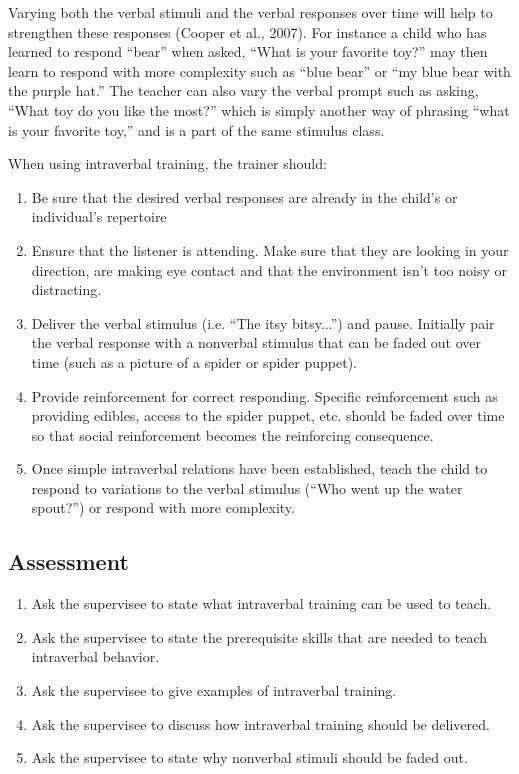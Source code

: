 Varying both the verbal stimuli and the verbal responses over time will help to strengthen these responses (Cooper et al., 2007).   For instance a child who has learned to respond ``bear'' when asked, ``What is your favorite toy?'' may then learn to respond with more complexity such as ``blue bear'' or ``my blue bear with the purple hat.''  The teacher can also vary the verbal prompt such as asking, ``What toy do you like the most?'' which is simply another way of phrasing ``what is your favorite toy,'' and is a part of the same stimulus class.    

When using intraverbal training, the trainer should:
\begin{enumerate}
\item Be sure that the desired verbal responses are already in the child's or individual's repertoire
\item Ensure that the listener is attending.  Make sure that they are looking in your direction, are making eye contact and that the environment isn't too noisy or distracting.
\item Deliver the verbal stimulus (i.e. ``The itsy bitsy...'') and pause.  Initially pair the verbal response with a nonverbal stimulus that can be faded out over time (such as a picture of a spider or spider puppet).
\item Provide reinforcement for correct responding. Specific reinforcement such as providing edibles, access to the spider puppet, etc. should be faded over time so that social reinforcement becomes the reinforcing consequence.  
\item Once simple intraverbal relations have been established, teach the child to respond to variations to the verbal stimulus (``Who went up the water spout?'') or respond with more complexity.    
\end{enumerate}
%
\subsection{Assessment}
\begin{enumerate}
\item Ask the supervisee to state what intraverbal training can be used to teach.
\item Ask the supervisee to state the prerequisite skills that are needed to teach intraverbal behavior.  
\item Ask the supervisee to give examples of intraverbal training.
\item Ask the supervisee to discuss how intraverbal training should be delivered.
\item Ask the supervisee to state why nonverbal stimuli should be faded out.
\end{enumerate}
%
